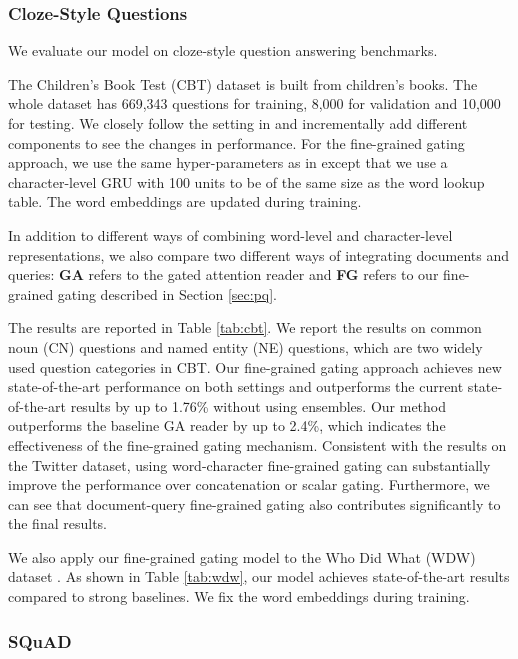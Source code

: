 \documentclass{article} \usepackage{iclr2017_conference,times}
\begin{document}
\subsubsection{Cloze-Style Questions}

We evaluate our model on cloze-style question answering benchmarks.

The Children's Book Test (CBT) dataset is built from children's books. The whole dataset has 669,343 questions for training, 8,000 for validation and 10,000 for testing. We closely follow the setting in \cite{dhingra2016gated} and incrementally add different components to see the changes in performance. For the fine-grained gating approach, we use the same hyper-parameters as in \cite{dhingra2016gated} except that we use a character-level GRU with 100 units to be of the same size as the word lookup table. The word embeddings are updated during training.

In addition to different ways of combining word-level and character-level representations, we also compare two different ways of integrating documents and queries: \textbf{GA} refers to the gated attention reader \citep{dhingra2016gated} and \textbf{FG} refers to our fine-grained gating described in Section \ref{sec:pq}.

The results are reported in Table \ref{tab:cbt}. We report the results on common noun (CN) questions and named entity (NE) questions, which are two widely used question categories in CBT. Our fine-grained gating approach achieves new state-of-the-art performance on both settings and outperforms the current state-of-the-art results by up to 1.76\% without using ensembles. Our method outperforms the baseline GA reader by up to 2.4\%, which indicates the effectiveness of the fine-grained gating mechanism. Consistent with the results on the Twitter dataset, using word-character fine-grained gating can substantially improve the performance over concatenation or scalar gating. Furthermore, we can see that document-query fine-grained gating also contributes significantly to the final results.

We also apply our fine-grained gating model to the Who Did What (WDW) dataset \citep{onishi2016did}. As shown in Table \ref{tab:wdw}, our model achieves state-of-the-art results compared to strong baselines. We fix the word embeddings during training.

\subsubsection{SQuAD}
\end{document}
